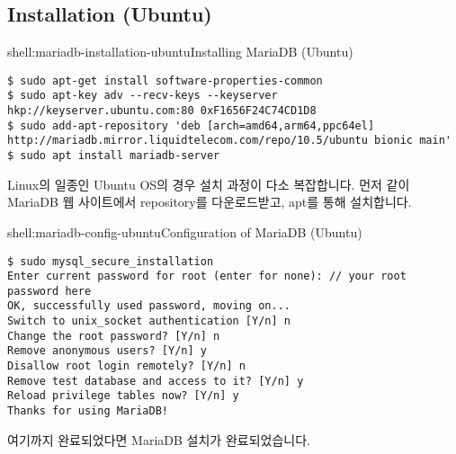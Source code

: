 \subsection*{Installation (Ubuntu)}

\begin{shellenv}{shell:mariadb-installation-ubuntu}{Installing MariaDB (Ubuntu)}\begin{verbatim}
$ sudo apt-get install software-properties-common
$ sudo apt-key adv --recv-keys --keyserver hkp://keyserver.ubuntu.com:80 0xF1656F24C74CD1D8
$ sudo add-apt-repository 'deb [arch=amd64,arm64,ppc64el] http://mariadb.mirror.liquidtelecom.com/repo/10.5/ubuntu bionic main'
$ sudo apt install mariadb-server
\end{verbatim}
\end{shellenv}

Linux의 일종인 Ubuntu OS의 경우 설치 과정이 다소 복잡합니다. 먼저 \와 같이 MariaDB 웹 사이트에서 repository를 다운로드받고, apt를 통해 설치합니다.

\begin{shellenv}{shell:mariadb-config-ubuntu}{Configuration of MariaDB (Ubuntu)}\begin{verbatim}
$ sudo mysql_secure_installation
Enter current password for root (enter for none): // your root password here
OK, successfully used password, moving on...
Switch to unix_socket authentication [Y/n] n
Change the root password? [Y/n] n
Remove anonymous users? [Y/n] y
Disallow root login remotely? [Y/n] n
Remove test database and access to it? [Y/n] y
Reload privilege tables now? [Y/n] y
Thanks for using MariaDB!
\end{verbatim}
\end{shellenv}

여기까지 완료되었다면 MariaDB 설치가 완료되었습니다.
